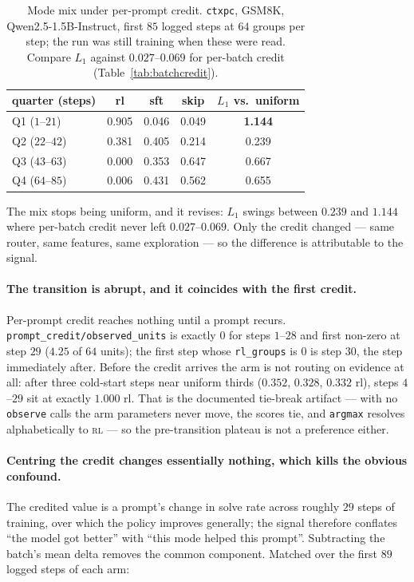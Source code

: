 \begin{table}[t]
\centering\small
\caption{Mode mix under per-prompt credit. \texttt{ctxpc}, GSM8K, Qwen2.5-1.5B-Instruct,
first $85$ logged steps at $64$ groups per step; the run was still training when these were
read. Compare $L_1$ against $0.027$--$0.069$ for per-batch credit
(Table~\ref{tab:batchcredit}).}
\label{tab:promptcredit}
\begin{tabular}{lcccc}
\toprule
quarter (steps) & rl & sft & skip & $L_1$ vs.\ uniform \\
\midrule
Q1 ($1$--$21$)  & 0.905 & 0.046 & 0.049 & \textbf{1.144} \\
Q2 ($22$--$42$) & 0.381 & 0.405 & 0.214 & 0.239 \\
Q3 ($43$--$63$) & 0.000 & 0.353 & 0.647 & 0.667 \\
Q4 ($64$--$85$) & 0.006 & 0.431 & 0.562 & 0.655 \\
\bottomrule
\end{tabular}
\end{table}

The mix stops being uniform, and it revises: $L_1$ swings between $0.239$ and $1.144$ where
per-batch credit never left $0.027$--$0.069$. Only the credit changed --- same router, same
features, same exploration --- so the difference is attributable to the signal.

\paragraph{The transition is abrupt, and it coincides with the first credit.} Per-prompt
credit reaches nothing until a prompt recurs. \texttt{prompt\_credit/observed\_units} is
exactly $0$ for steps $1$--$28$ and first non-zero at step $29$ ($4.25$ of $64$ units); the
first step whose \texttt{rl\_groups} is $0$ is step $30$, the step immediately after. Before
the credit arrives the arm is not routing on evidence at all: after three cold-start steps
near uniform thirds ($0.352$, $0.328$, $0.332$ rl), steps $4$--$29$ sit at exactly $1.000$ rl.
That is the documented tie-break artifact --- with no \texttt{observe} calls the arm
parameters never move, the scores tie, and \texttt{argmax} resolves alphabetically to
\textsc{rl} --- so the pre-transition plateau is not a preference either.

\paragraph{Centring the credit changes essentially nothing, which kills the obvious
confound.} The credited value is a prompt's change in solve rate across roughly $29$ steps of
training, over which the policy improves generally; the signal therefore conflates ``the model
got better'' with ``this mode helped this prompt''. Subtracting the batch's mean delta removes
the common component. Matched over the first $89$ logged steps of each arm:

